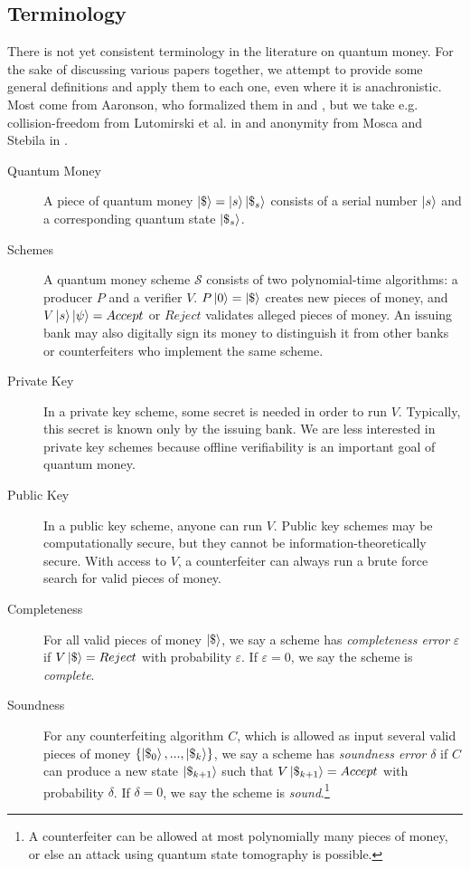 \documentclass[12pt]{article}
\begin{document}
\subsection{Terminology}
There is not yet consistent terminology in the literature on quantum money.  For the sake of discussing various papers together, we attempt to provide some general definitions and apply them to each one, even where it is anachronistic.  Most come from Aaronson, who formalized them in \cite{Aar09} and \cite{Aar13}, but we take e.g. collision-freedom from Lutomirski et al. in \cite{Lut09} and anonymity from Mosca and Stebila in \cite{Mos10}.

\begin{description}
\item[Quantum Money] A piece of quantum money $\Ket{\$} = \Ket{s}\Ket{\$_s}$ consists of a serial number $\Ket{s}$ and a corresponding quantum state $\Ket{\$_s}$.
\item[Schemes] A quantum money scheme $\mathscr{S}$ consists of two polynomial-time algorithms: a producer $P$ and a verifier $V$.  $P\Ket{0} = \Ket{\$}$ creates new pieces of money, and $V\Ket{s}\Ket{\psi} = Accept$ or $Reject$ validates alleged pieces of money.  An issuing bank may also digitally sign its money to distinguish it from other banks or counterfeiters who implement the same scheme.
\item[Private Key] In a private key scheme, some secret is needed in order to run $V$.  Typically, this secret is known only by the issuing bank.  We are less interested in private key schemes because offline verifiability is an important goal of quantum money.
\item[Public Key] In a public key scheme, anyone can run $V$.  Public key schemes may be computationally secure, but they cannot be information-theoretically secure.  With access to $V$, a counterfeiter can always run a brute force search for valid pieces of money.
\item[Completeness] For all valid pieces of money $\Ket{\$}$, we say a scheme has \emph{completeness error} $\varepsilon$ if $V\Ket{\$}=Reject$ with probability $\varepsilon$.  If $\varepsilon=0$, we say the scheme is \emph{complete}.
\item[Soundness] For any counterfeiting algorithm $C$, which is allowed as input several valid pieces of money $\{\Ket{\$_0},...,\Ket{\$_k}\}$, we say a scheme has \emph{soundness error} $\delta$ if $C$ can produce a new state $\Ket{\$_{k+1}}$ such that  $V\Ket{\$_{k+1}}=Accept$ with probability $\delta$.  If $\delta=0$, we say the scheme is \emph{sound}.\footnote{A counterfeiter can be allowed at most polynomially many pieces of money, or else an attack using quantum state tomography is possible.}

\end{description}
\end{document}
